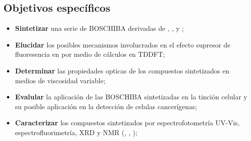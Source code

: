 \subsection{Objetivos específicos}
\begin{itemize}
	\item \textbf{Sintetizar} una serie de \gls{BOSCHIBA} derivadas de , ,  y ;
	\item \textbf{Elucidar} los posibles mecanismos involucrados en el efecto supresor de fluoresencia en  por medio de cálculos \insilico{} en \gls{TDDFT};
	\item \textbf{Determinar} las propiedades opticas de los compuestos sintetizados en medios de viscosidad variable;
	\item \textbf{Evalular} la aplicación de las \gls{BOSCHIBA} sintetizadas en la tinción celular y su posible aplicación en la detección de celulas cancerígenas;
	\item \textbf{Caracterizar} los compuestos sintetizados por espectrofotometría UV-Vis, espectrofluorimetría, \gls{XRD} y \gls{NMR} (, , );
\end{itemize}
